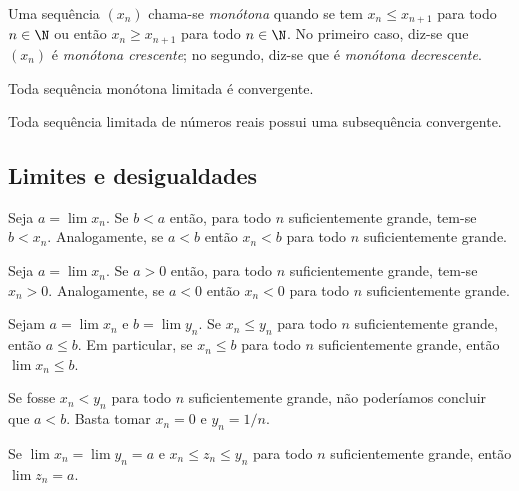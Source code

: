 \documentclass{article}
\begin{document}
\begin{defn}
    Uma sequência \((x_n)\) chama-se \emph{monótona} quando se tem \(x_n \leq x_{n+1}\) para todo \(n \in \N\) ou então \(x_n \geq x_{n+1}\) para todo \(n \in \N\). No primeiro caso, diz-se que \((x_n)\) é \emph{monótona crescente}; no segundo, diz-se que é \emph{monótona decrescente}.
\end{defn}

\begin{prop}
    Toda sequência monótona limitada é convergente.
\end{prop}

\begin{cor} 
    Toda sequência limitada de números reais possui uma subsequência convergente.
\end{cor}

\subsection{Limites e desigualdades}

\begin{prop}
    Seja \(a = \lim x_n\). Se \(b < a\) então, para todo \(n\) suficientemente grande, tem-se \(b < x_n\). Analogamente, se \(a < b\) então \(x_n < b\) para todo \(n\) suficientemente grande.
\end{prop}

\begin{cor}
    Seja \(a = \lim x_n\). Se \(a > 0\) então, para todo \(n\) suficientemente grande, tem-se \(x_n > 0\). Analogamente, se \(a < 0\) então \(x_n < 0\) para todo \(n\) suficientemente grande.
\end{cor}

\begin{cor}
    Sejam \(a = \lim x_n\) e \(b = \lim y_n\). Se \(x_n \leq y_n\) para todo \(n\) suficientemente grande, então \(a \leq b\). Em particular, se \(x_n \leq b\) para todo \(n\) suficientemente grande, então \(\lim x_n \leq b\).
\end{cor}

\begin{rem}
    Se fosse \(x_n < y_n\) para todo \(n\) suficientemente grande, não poderíamos concluir que \(a < b\). Basta tomar \(x_n = 0\) e \(y_n = 1/n\).
\end{rem}

\begin{thm} 
    Se \(\lim x_n = \lim y_n = a\) e \(x_n \leq z_n \leq y_n\) para todo \(n\) suficientemente grande, então \(\lim z_n = a\).
\end{thm}
\end{document}
